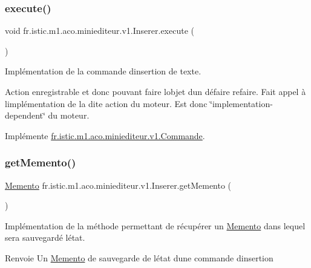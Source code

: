 \subsubsection{\texorpdfstring{execute()}{execute()}}
{\footnotesize\ttfamily void fr.\+istic.\+m1.\+aco.\+miniediteur.\+v1.\+Inserer.\+execute (\begin{DoxyParamCaption}{ }\end{DoxyParamCaption})}



Implémentation de la commande d\textquotesingle{}insertion de texte. 

Action enregistrable et donc pouvant faire l\textquotesingle{}objet d\textquotesingle{}un défaire refaire. Fait appel à l\textquotesingle{}implémentation de la dite action du moteur. Est donc \char`\"{}implementation-\/dependent\char`\"{} du moteur. 

Implémente \hyperlink{interfacefr_1_1istic_1_1m1_1_1aco_1_1miniediteur_1_1v1_1_1Commande_a87a8a55bac4e81e32339248f79f7de4f}{fr.\+istic.\+m1.\+aco.\+miniediteur.\+v1.\+Commande}.

\mbox{\label{classfr_1_1istic_1_1m1_1_1aco_1_1miniediteur_1_1v1_1_1Inserer_a4091c321237a04db9509b01e2baf768f}} 
\subsubsection{\texorpdfstring{get\+Memento()}{getMemento()}}
{\footnotesize\ttfamily \hyperlink{interfacefr_1_1istic_1_1m1_1_1aco_1_1miniediteur_1_1v1_1_1Memento}{Memento} fr.\+istic.\+m1.\+aco.\+miniediteur.\+v1.\+Inserer.\+get\+Memento (\begin{DoxyParamCaption}{ }\end{DoxyParamCaption})}



Implémentation de la méthode permettant de récupérer un \hyperlink{interfacefr_1_1istic_1_1m1_1_1aco_1_1miniediteur_1_1v1_1_1Memento}{Memento} dans lequel sera sauvegardé l\textquotesingle{}état. 

\begin{DoxyReturn}{Renvoie}
Un \hyperlink{interfacefr_1_1istic_1_1m1_1_1aco_1_1miniediteur_1_1v1_1_1Memento}{Memento} de sauvegarde de l\textquotesingle{}état d\textquotesingle{}une commande d\textquotesingle{}insertion 
\end{DoxyReturn}


